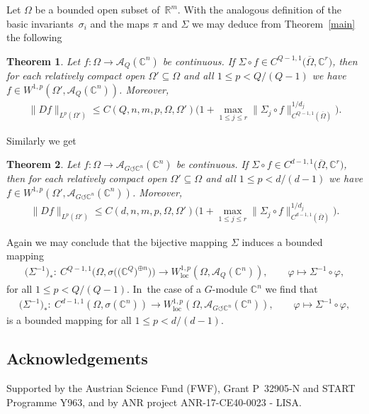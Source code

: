\documentclass[pdftex]{sigma}
\numberwithin{equation}{section}
\newtheorem{Theorem}{Theorem}[section]
\def\si{\sigma}
\def\vh{\varphi}
\def\Si{\Sigma}
\def\Om{\Omega}
\def\C{\mathbb{C}}
\def\R{\mathbb{R}}
\def\cA{\mathcal{A}}
\def\ol{\overline}
\renewcommand{\o}{\circ}
\def\acts{\circlearrowleft}
\let\on=\operatorname
\begin{document}
Let $\Om$ be a bounded open subset of~$\R^m$.
With the analogous definition of the basic invariants~$\si_i$ and the maps $\pi$ and $\Si$ we may deduce from Theorem~\ref{main} the following

\begin{Theorem}
 Let $f \colon \Om \to \cA_Q(\C^n)$ be continuous.
 If $\Si \o f \in C^{Q-1,1}\big(\ol \Om,\C^r\big)$, then
 for each relatively compact open $\Om' \subseteq \Om$ and all $1 \le p < Q/(Q-1)$ we have
 $f \in W^{1,p}(\Om',\cA_Q(\C^n))$.
 Moreover,
 \begin{gather*}
 \|D f\|_{L^p(\Om')} \le C(Q,n,m,p,\Om,\Om') \Big(1 + \max_{1 \le j \le r} \|\Si_j \o f\|^{1/d_j}_{C^{Q-1,1}(\ol \Om)}\Big).
 \end{gather*}
\end{Theorem}


Similarly we get

\begin{Theorem}
 Let $f\colon \Om \to \cA_{G \acts \C^n}(\C^n)$ be continuous.
 If $\Si \o f \in C^{d-1,1}\big(\ol \Om,\C^r\big)$, then
 for each relatively compact open $\Om' \subseteq \Om$ and all $1 \le p < d/(d-1)$ we have
 $f \in W^{1,p}(\Om',\cA_{G \acts \C^n}(\C^n))$.
 Moreover,
 \begin{gather*}
 \|D f\|_{L^p(\Om')} \le C(d,n,m,p,\Om,\Om') \Big(1 + \max_{1 \le j \le r} \|\Si_j \o f\|^{1/d_j}_{C^{d-1,1}(\ol \Om)}\Big).
 \end{gather*}
\end{Theorem}

Again we may conclude that
the bijective mapping $\Si$ induces a bounded mapping
 \begin{gather*}
 \big(\Si^{-1}\big)_* \colon\ C^{Q-1,1}\big(\Om,\si\big(\big(\C^Q\big)^{\oplus n}\big)\big) \to W^{1,p}_{\on{loc}}(\Om,\cA_Q(\C^n)),\qquad \vh \mapsto \Si^{-1} \o \vh,
 \end{gather*}
 for all $1 \le p <Q/(Q-1)$. In~the case of a $G$-module $\C^n$ we find that
 \begin{gather*}
 \big(\Si^{-1}\big)_* \colon\ C^{d-1,1}(\Om,\si(\C^n)) \to W^{1,p}_{\on{loc}}(\Om,\cA_{G \acts \C^n}(\C^n)),\qquad \vh \mapsto \Si^{-1} \o \vh,
 \end{gather*}
 is a bounded mapping for all $1 \le p <d/(d-1)$.

\subsection*{Acknowledgements}
Supported by the Austrian Science Fund (FWF), Grant P~32905-N and START Programme Y963, and by ANR project ANR-17-CE40-0023 - LISA.
\end{document}
